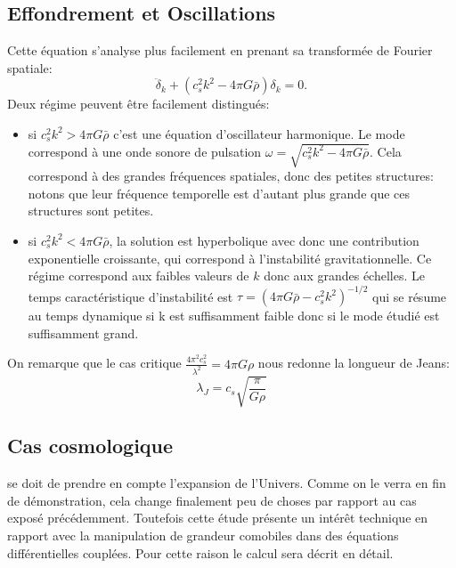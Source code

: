  \subsection{Effondrement et Oscillations}
 Cette équation s'analyse plus facilement en prenant sa transformée de Fourier spatiale:
 \begin{equation}
 \ddot \delta_k +(c_s^2k ^2-4\pi G \bar \rho) \delta_k= 0.
 \end{equation}
 Deux régime peuvent être facilement distingués:
 \begin{itemize}
 \item si $c_s^2 k^2> 4\pi G \bar \rho$ c'est une équation d'oscillateur harmonique. Le mode correspond à une onde sonore de pulsation $\omega=\sqrt{c_s^2 k^2-4\pi G \bar \rho}$. Cela correspond à des grandes fréquences spatiales, donc des petites structures: notons que leur fréquence temporelle est d'autant plus grande que ces structures sont petites.
 \item si $c_s^2 k^2< 4\pi G \bar \rho$, la solution est hyperbolique avec donc une contribution exponentielle croissante, qui correspond à l'instabilité gravitationnelle. Ce régime correspond aux faibles valeurs de $k$ donc aux grandes échelles. Le temps caractéristique d'instabilité est $\tau = (4\pi G \bar \rho - c_s^2k^2)^{-1/2}$ qui se résume au temps dynamique si k est suffisamment faible donc si le mode étudié est suffisamment grand. 
 \end{itemize}
 
 On remarque que le cas critique $\frac{4\pi^2c_s^2}{\lambda^2}=4\pi G \rho$ nous redonne la longueur de Jeans:
 \begin{equation}
 \lambda_J=c_s\sqrt{\frac{\pi}{G\rho}}
 \end{equation}
 
 \subsection{Cas cosmologique}
 se doit de prendre en compte l'expansion de l'Univers. Comme on le verra en fin de démonstration, cela change finalement peu de choses par rapport au cas exposé précédemment. Toutefois cette étude présente un intérêt technique en rapport avec la manipulation de grandeur comobiles dans des équations différentielles couplées. Pour cette raison le calcul sera décrit en détail.

